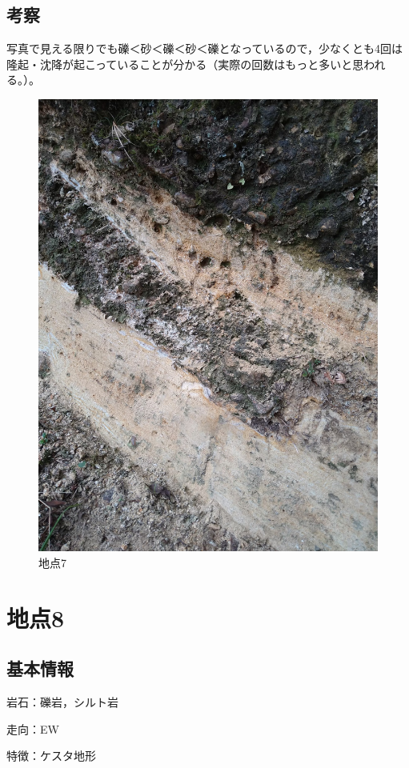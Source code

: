 \documentclass[uplatex,b5paper]{jsreport}
\begin{document}
    \subsection{考察}
    写真で見える限りでも礫＜砂＜礫＜砂＜礫となっているので，少なくとも4回は隆起・沈降が起こっていることが分かる（実際の回数はもっと多いと思われる。）。
  \begin{figure}[h]
    \begin{center}
      \includegraphics[scale=0.08]{files/地学実習/地点7.jpg}
      \caption{地点7}
    \end{center}    
  \end{figure}
  \clearpage

  \section{地点8}
    \subsection{基本情報}
    岩石：礫岩，シルト岩\par
    走向：EW\par
    特徴：ケスタ地形
\end{document}
